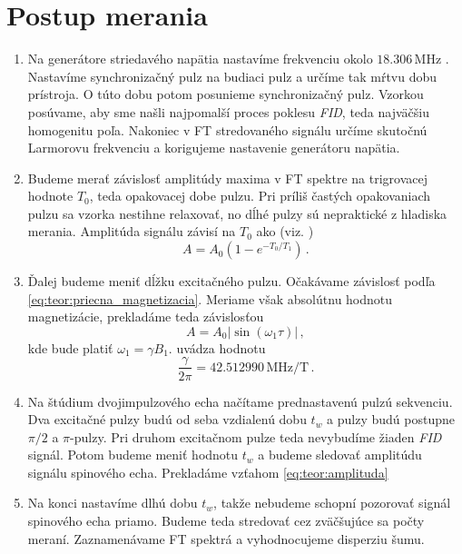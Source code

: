 \documentclass[a4paper, 10pt]{article}
\newcommand{\unit}[1]{\ensuremath{\, \mathrm{#1}}}
\begin{document}
\section*{Postup merania}
\begin{enumerate}
\item Na generátore striedavého napätia nastavíme frekvenciu okolo
$18.306\unit{MHz}$ \cite{pokyny}. Nastavíme synchronizačný pulz na budiaci pulz a určíme tak mŕtvu dobu prístroja. O túto dobu potom posunieme synchronizačný pulz. Vzorkou posúvame, aby sme našli najpomalší proces poklesu \textit{FID}, teda najväčšiu homogenitu poľa. Nakoniec v FT stredovaného signálu určíme skutočnú Larmorovu frekvenciu a korigujeme nastavenie generátoru napätia.

    \item Budeme merať závislosť amplitúdy maxima v FT spektre na trigrovacej hodnote $T_0$, teda opakovacej dobe pulzu. Pri príliš častých opakovaniach pulzu sa vzorka nestihne relaxovať, no dĺhé pulzy sú nepraktické z hladiska merania. Amplitúda signálu závisí na $T_0$ ako (viz. \cite{stud})
    \begin{equation}
    \label{eq:postup:amplituda_trig}
    A = A_0 \left(1-e^{-T_0/T_1}\right)\,.
    \end{equation}
    
    \item Ďalej budeme meniť dĺžku excitačného pulzu. Očakávame závislosť podľa \ref{eq:teor:priecna_magnetizacia}. Meriame však absolútnu hodnotu magnetizácie, prekladáme teda závislosťou
    \begin{equation}
    \label{eq:postup:amplituda_pulz}
    A = A_0 |\sin (\omega_1 \tau)|\,,
    \end{equation}
    kde bude platiť $\omega_1 = \gamma B_1$. \cite{pokyny} uvádza hodnotu
    \begin{equation}
    \label{eq:postup:gamma}
    \frac{\gamma}{2\pi} = 42.512990 \unit{MHz/T}\,.
    \end{equation}
    
    \item Na štúdium dvojimpulzového echa načítame prednastavenú pulzú sekvenciu. Dva excitačné pulzy budú od seba vzdialenú dobu $t_{w}$ a pulzy budú postupne $\pi/2$ a $\pi$-pulzy. Pri druhom excitačnom pulze teda nevybudíme žiaden \textit{FID} signál. Potom budeme meniť hodnotu $t_{w}$ a budeme sledovať amplitúdu signálu spinového echa. Prekladáme vzťahom \ref{eq:teor:amplituda}

    \item Na konci nastavíme dlhú dobu $t_{w}$, takže nebudeme schopní pozorovať signál spinového echa priamo. Budeme teda stredovať cez zväčšujúce sa počty meraní. Zaznamenávame FT spektrá a vyhodnocujeme disperziu šumu.

\end{enumerate}
\end{document}
